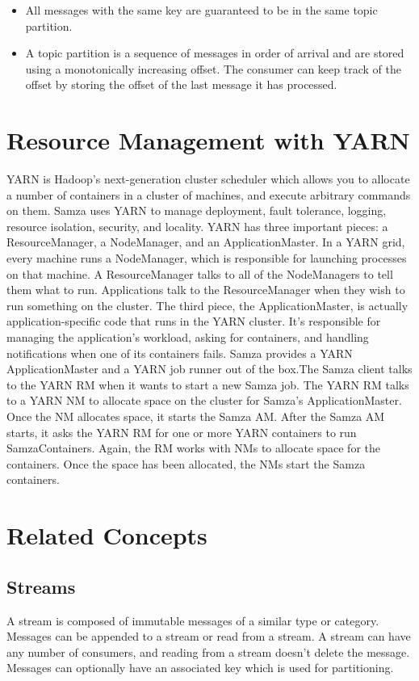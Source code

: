 \documentclass[9pt,twocolumn,twoside]{styles/osajnl}
\begin{document}
\begin{itemize}
\renewcommand{\labelitemi}{\scriptsize$\square$} 
\item All messages with the same key are guaranteed to be in the same topic partition.
\item A topic partition is a sequence of messages in order of arrival and are stored
using a monotonically increasing offset. The consumer can keep track of the
offset by storing the offset of the last message it has processed. 
\end{itemize}

\section{Resource Management with YARN}
YARN is Hadoop’s next-generation cluster scheduler which allows you to allocate
a number of containers in a cluster of machines, and execute arbitrary commands
on them. Samza uses YARN to manage deployment, fault tolerance, logging,
resource isolation, security, and locality. YARN has three important pieces: a
ResourceManager, a NodeManager, and an ApplicationMaster. In a YARN grid, every
machine runs a NodeManager, which is responsible for launching processes on that
machine. A ResourceManager talks to all of the NodeManagers to tell them what to
run. Applications talk to the ResourceManager when they wish to run something on
the cluster. The third piece, the ApplicationMaster, is actually
application-specific code that runs in the YARN cluster. It’s responsible for
managing the application’s workload, asking for containers, and handling
notifications when one of its containers fails.\cite{paper3}
Samza provides a YARN ApplicationMaster and a YARN job runner out of the box.The
Samza client talks to the YARN RM when it wants to start a new Samza job. The
YARN RM talks to a YARN NM to allocate space on the cluster for Samza’s
ApplicationMaster. Once the NM allocates space, it starts the Samza AM. After
the Samza AM starts, it asks the YARN RM for one or more YARN containers to run
SamzaContainers. Again, the RM works with NMs to allocate space for the
containers. Once the space has been allocated, the NMs start the Samza
containers.\cite{paper4}

\section{Related Concepts}

\subsection{Streams}
A stream is composed of immutable messages of a similar type or category.
Messages can be appended to a stream or read from a stream. A stream can have
any number of consumers, and reading from a stream doesn’t delete the message.
Messages can optionally have an associated key which is used for partitioning.
\cite{www-samza}
\end{document}
